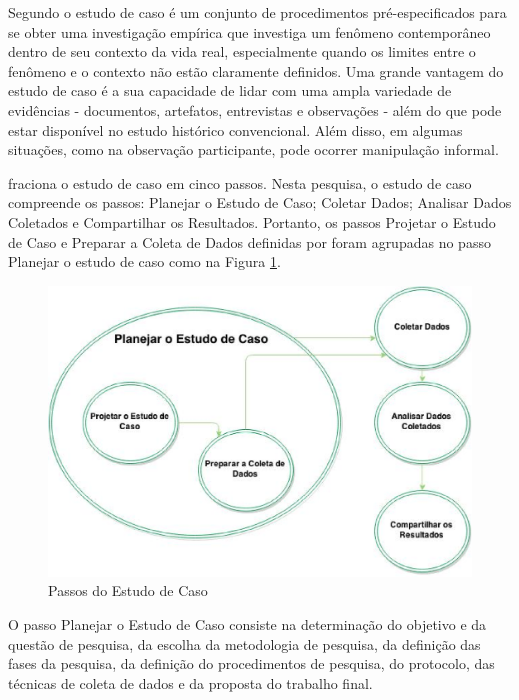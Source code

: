 Segundo \cite{yin2001estudo} o estudo de caso é um conjunto de procedimentos pré-especificados para se obter uma investigação empírica que investiga um fenômeno contemporâneo dentro de seu contexto da vida real, especialmente quando os limites entre o fenômeno e o contexto não estão claramente definidos. Uma grande vantagem do estudo de caso é a sua capacidade de lidar com uma ampla variedade de evidências - documentos, artefatos, entrevistas e observações - além do que pode estar disponível no estudo histórico convencional. Além disso, em algumas situações, como na observação participante, pode ocorrer manipulação informal.

\cite{wohlin2012experimentation} fraciona o estudo de caso em cinco passos. Nesta pesquisa, o estudo de caso compreende os passos: Planejar o Estudo de Caso; Coletar Dados; Analisar Dados Coletados e Compartilhar os Resultados. Portanto, os passos Projetar o Estudo de Caso e Preparar a Coleta de Dados definidas por  foram agrupadas no passo Planejar o estudo de caso como na Figura \ref{passo Estudo de Caso}.

\begin{figure}[h!]
\centering
\includegraphics[keepaspectratio=false,scale=0.5]{figuras/figuras_nilton/passosEstudoCaso.eps}
\caption{Passos do Estudo de Caso}
\label{passo Estudo de Caso}
\end{figure}

O passo Planejar o Estudo de Caso consiste na determinação do objetivo e da questão de pesquisa, da escolha da metodologia de pesquisa, da definição das fases da pesquisa, da definição do procedimentos de pesquisa, do protocolo, das técnicas de coleta de dados e da proposta do trabalho final.

